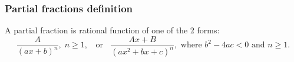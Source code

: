 \begin{frame}
\frametitle{Partial fractions definition}
\begin{definition} 
A partial fraction is rational function of one of the 2 forms:  
\[
\frac{A}{(ax+b)^n},\;  n\geq 1, \;\;\textrm{ or }\;\;
 \frac{Ax+B}{(ax^{2}+bx+c)^n}, \text{ where }  b^2-4ac<0  \text{ and }  n\geq 1.
\]  
\end{definition}
\end{frame}
